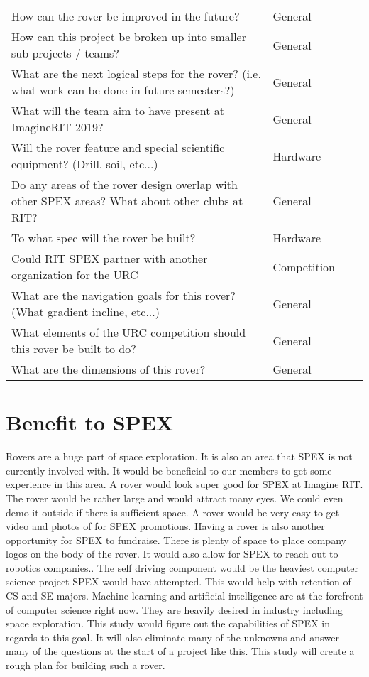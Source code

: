 \documentclass[conference]{IEEEtran} %
\begin{document}
\begin{table*}
\begin{tabular}{@{}llcc@{}}
        How can the rover be improved in the future? & General \\
        How can this project be broken up into smaller sub projects / teams? & General \\
        What are the next logical steps for the rover? (i.e. what work can be done in future semesters?) & General \\
        What will the team aim to have present at ImagineRIT 2019? & General \\ 
        Will the rover feature and special scientific equipment? (Drill, soil, etc...) & Hardware \\
        Do any areas of the rover design overlap with other SPEX areas? What about other clubs at RIT? & General \\
        To what spec will the rover be built? & Hardware \\
        Could RIT SPEX partner with another organization for the URC & Competition \\
        What are the navigation goals for this rover? (What gradient incline, etc...) & General \\
        What elements of the URC competition should this rover be built to do? & General \\
        What are the dimensions of this rover? & General \\
        \bottomrule
    \end{tabular}
\label{tab:questions}
\end{table*}

\section{Benefit to SPEX}
\label{sec:benefit}

Rovers are a huge part of space exploration. It is also an area that SPEX is not currently involved with. 
It would be beneficial to our members to get some experience in this area.
A rover would look super good for SPEX at Imagine RIT. 
The rover would be rather large and would attract many eyes. We could even demo it outside if there is sufficient space. 
A rover would be very easy to get video and photos of for SPEX promotions. 
Having a rover is also another opportunity for SPEX to fundraise. 
There is plenty of space to place company logos on the body of the rover. It would also allow for SPEX to reach out to robotics companies.. 
The self driving component would be the heaviest computer science project SPEX would have attempted. 
This would help with retention of CS and SE majors. 
Machine learning and artificial intelligence are at the forefront of computer science right now. 
They are heavily desired in industry including space exploration.
This study would figure out the capabilities of SPEX in regards to this goal. 
It will also eliminate many of the unknowns and answer many of the questions at the start of a project like this. 
This study will create a rough plan for building such a rover.
\end{document}
